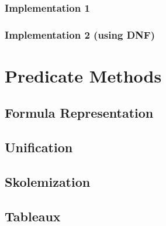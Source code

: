 \documentclass[a4paper,notitlepage]{scrartcl}
\begin{document}
\subsubsection{Implementation 1} 
\subsubsection{Implementation 2 (using DNF)}

\section{Predicate Methods}

\subsection{Formula Representation}

\subsection{Unification}

\subsection{Skolemization}

\subsection{Tableaux}
\end{document}
